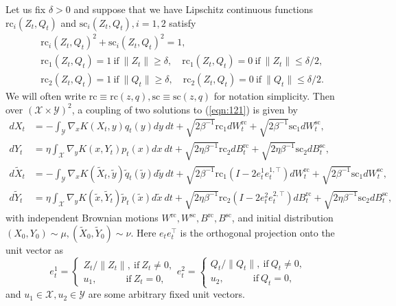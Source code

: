 \documentclass[11pt]{article}
\newcommand{\1}{\mathds{1}}
\newcommand{\frc}{\text{rc}}
\newcommand{\fsc}{\text{sc}}
\begin{document}
Let us fix $\delta>0$ and suppose that we have Lipschitz continuous functions $\frc_i(Z_t, Q_t)$ and $\fsc_i(Z_t, Q_t), i=1,2$ satisfy
\begin{equation}
\begin{aligned}
    &\frc_i(Z_t, Q_t)^2 + \fsc_i(Z_t, Q_t)^2 = 1,\\
    &\frc_1(Z_t, Q_t) = 1 ~\text{if}~\|Z_t\|\geq \delta, \quad  \frc_1(Z_t, Q_t) = 0 ~\text{if}~\|Z_t\|\leq \delta/2,\\
    &\frc_2(Z_t, Q_t) = 1 ~\text{if}~\|Q_t\|\geq \delta, \quad  \frc_2(Z_t, Q_t) = 0 ~\text{if}~\|Q_t\|\leq \delta/2.
\end{aligned}
\end{equation}
We will often write $\frc \equiv \frc(z,q), \fsc \equiv \fsc(z,q)$ for notation simplicity. Then over $(\mathcal{X}\times \mathcal{Y})^2$, a coupling of two solutions to (\ref{eqn:121}) is given by 
\begin{equation}\label{oct291}
\begin{aligned}
    d X_t &=-\int_{\mathcal{Y}} \nabla_x K(X_t,y) q_t(y) dy~dt + \sqrt{2\beta^{-1}} \frc_1 dW_t^{\frc}+ \sqrt{2\beta^{-1}} \fsc_1dW_t^{\fsc},\\
    dY_t&=\eta \int_{\mathcal{X}} \nabla_y K(x,Y_t) p_t(x) dx~dt + \sqrt{2\eta\beta^{-1}}\frc_2 d B_t^{\frc}+ \sqrt{2\eta\beta^{-1}}\fsc_2 d B_t^{\fsc},\\
    d\tilde{X}_t &=-\int_{\mathcal{Y}} \nabla_x K(\tilde{X}_t,\tilde{y}) \tilde{q}_t(\tilde{y}) d\tilde{y}~dt + \sqrt{2\beta^{-1}} \frc_1(I-2e_t^1 e_t^{1,\top}) dW_t^{\frc}+ \sqrt{2\beta^{-1}} \fsc_1dW_t^{\fsc},\\
    d\tilde{Y}_t&=\eta \int_{\mathcal{X}} \nabla_y K(\tilde{x},\tilde{Y}_t) \tilde{p}_t(\tilde{x}) d\tilde{x}~dt + \sqrt{2\eta\beta^{-1}}\frc_2 (I-2e_t^2 e_t^{2,\top}) d B_t^{\frc}+ \sqrt{2\eta\beta^{-1}}\fsc_2 d B_t^{\fsc},
\end{aligned}
\end{equation}
with independent Brownian motions $W^{\frc}, W^{\fsc}, B^{\frc}, B^{\fsc}$, and initial distribution $(X_0, Y_0)\sim \mu, (\tilde{X}_0, \tilde{Y}_0)\sim \nu$. Here $e_t e_t^\top$ is the orthogonal projection onto the unit vector as
\begin{equation}
    e_t^1  =\begin{cases} Z_t/\|Z_t\|, ~\text{if}~Z_t\neq 0,\\ u_1,\quad  \quad\quad\text{if}~Z_t=0,
    \end{cases} e_t^2 =\begin{cases} Q_t/\|Q_t\|, ~\text{if}~Q_t\neq 0,\\ u_2,\quad  \quad\quad \text{if}~Q_t=0,
    \end{cases}
\end{equation}
and $u_1\in\mathcal{X}, u_2\in\mathcal{Y}$ are some arbitrary fixed unit vectors.
\end{document}
